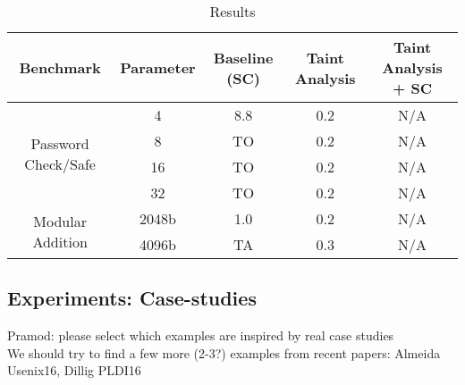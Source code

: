 \begin{table}
    \centering
    \begin{tabular}{ccccc}
        \toprule
        \textbf{Benchmark} & \textbf{Parameter} & \textbf{Baseline (SC)} & \textbf{Taint Analysis} & \textbf{Taint Analysis + SC} \\
        \midrule
        \multirow{4}{*}{Password Check/Safe} 
        &   4   &          8.8 &        0.2 &    N/A \\
        &   8   & TO          & 0.2     & N/A \\
        &   16  & TO          & 0.2     & N/A \\
        &   32  & TO          & 0.2     & N/A \\
        \midrule
        \multirow{2}{*}{Modular Addition} 
        & 2048b & 1.0 & 0.2 & N/A \\
        & 4096b & TA  & 0.3 & N/A \\
        \bottomrule
    \end{tabular}   
    \caption{Results}
    \label{tab:results}
\end{table}
\begin{center}
\end{center}
\subsection{Experiments: Case-studies}
Pramod: please select which examples are inspired by real case studies \\
We should try to find a few more (2-3?) examples from recent papers: Almeida Usenix16, Dillig PLDI16 \\






